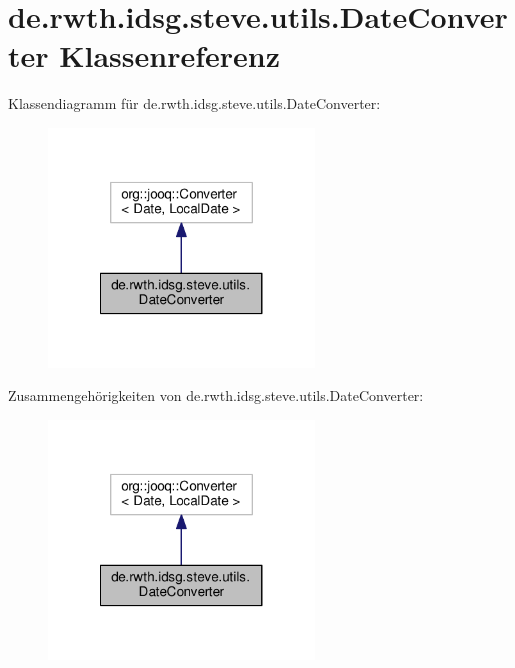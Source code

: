 \hypertarget{classde_1_1rwth_1_1idsg_1_1steve_1_1utils_1_1_date_converter}{\section{de.\-rwth.\-idsg.\-steve.\-utils.\-Date\-Converter Klassenreferenz}
\label{classde_1_1rwth_1_1idsg_1_1steve_1_1utils_1_1_date_converter}
}


Klassendiagramm für de.\-rwth.\-idsg.\-steve.\-utils.\-Date\-Converter\-:\nopagebreak
\begin{figure}[H]
\begin{center}
\leavevmode
\includegraphics[width=200pt]{classde_1_1rwth_1_1idsg_1_1steve_1_1utils_1_1_date_converter__inherit__graph}
\end{center}
\end{figure}


Zusammengehörigkeiten von de.\-rwth.\-idsg.\-steve.\-utils.\-Date\-Converter\-:\nopagebreak
\begin{figure}[H]
\begin{center}
\leavevmode
\includegraphics[width=200pt]{classde_1_1rwth_1_1idsg_1_1steve_1_1utils_1_1_date_converter__coll__graph}
\end{center}
\end{figure}
